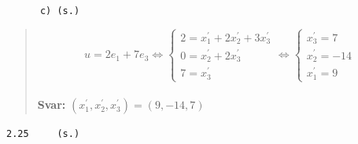 \documentclass[a4paper]{article}
\newcommand{\tskcol}[1]{\textcolor{tskcol}{#1}}
\begin{document}
\pagebreak
\texttt{\tskcol{~~~~~~c) (s.)}}
\begin{quotation}
	\noindent
	\[u=
	2e_1+7e_3 \Leftrightarrow
	\begin{cases}
	2=x^{'}_1+2x^{'}_2+3x^{'}_3 \\
	0=x^{'}_2+2x^{'}_3 \\
	7=x^{'}_3
	\end{cases} \Leftrightarrow
	\begin{cases}
	x^{'}_3=7 \\
	x^{'}_2=-14 \\
	x^{'}_1=9
	\end{cases}\]
	\\
	\textbf{Svar:} $(x^{'}_1,x^{'}_2,x^{'}_3)=(9,-14,7)$
\end{quotation}

\texttt{\tskcol{2.25~~~~ (s.)}}
\end{document}
